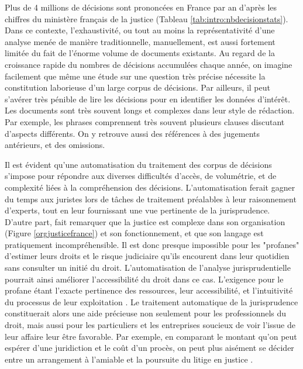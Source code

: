 Plus de 4 millions de décisions sont prononcées en France par an d'après les chiffres du ministère français de la justice (Tableau \ref{tab:intro:nbdecisionstats}). Dans ce contexte, l'exhaustivité, ou tout au moins la représentativité d'une analyse menée de manière traditionnelle, manuellement, est aussi fortement limitée du fait de l'énorme volume de documents existants. 
Au regard de la croissance rapide du nombres de décisions accumulées chaque année, on imagine facilement que même une étude sur une question très précise nécessite la constitution laborieuse d'un large corpus de décisions. Par ailleurs, il peut s'avérer très pénible de lire les décisions pour en identifier les données d'intérêt. Les documents sont très souvent longs et complexes dans leur style de rédaction. Par exemple, les phrases comprennent très souvent plusieurs clauses discutant d'aspects différents. On y retrouve aussi des références à des jugements antérieurs, et des omissions.


Il est évident qu'une automatisation du traitement des corpus de décisions s'impose pour répondre aux diverses difficultés d'accès, de volumétrie, et de complexité liées à la compréhension des décisions. L'automatisation ferait gagner du temps aux juristes lors de tâches de traitement préalables à leur raisonnement d'experts, tout en leur fournissant une vue pertinente de la jurisprudence. D'autre part, \citet{cretin2014justicecomplexe} fait remarquer que la justice est complexe dans son organisation (Figure \ref{orgjusticefrance}) et son fonctionnement, et que son langage est pratiquement incompréhensible. Il est donc presque impossible pour les "profanes" d'estimer leurs droits et le risque judiciaire qu'ils encourent dans leur quotidien sans consulter un initié du droit. L'automatisation de l'analyse jurisprudentielle pourrait ainsi améliorer l'accessibilité du droit dans ce cas.  L'exigence pour le profane étant l'exacte pertinence des ressources, leur accessibilité, et l'intuitivité du processus de leur exploitation \citep{narazenko2017legalnlpintro}. Le traitement automatique de la jurisprudence constituerait alors une aide précieuse non seulement pour les professionnels du droit, mais aussi pour les particuliers et les entreprises soucieux de voir l'issue de leur affaire leur être favorable. Par exemple, en comparant le montant qu'on peut espérer d'une juridiction et le coût d'un procès, on peut plus aisément se décider entre un arrangement à l'amiable et la poursuite du litige en justice \citep{langlaischappe2009ecoresolutionlitige}. 

